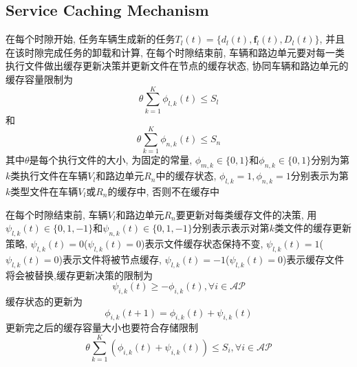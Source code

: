 \documentclass[lettersize,journal]{IEEEtran}
\begin{document}
{{\subsection{Service Caching Mechanism}
在每个时隙开始, 任务车辆生成新的任务$T_{l}(t)=\{d_{l}(t), \boldsymbol{f}_{l}(t),D_{l}(t)\}$, 并且在该时隙完成任务的卸载和计算, 在每个时隙结束前, 车辆和路边单元要对每一类执行文件做出缓存更新决策并更新文件在节点的缓存状态, 协同车辆和路边单元的缓存容量限制为
\begin{equation}
	\theta\sum^{K}_{k=1}{\phi_{l,k}(t)  } \le S_l
	\label{cache constraint vehicle}
\end{equation}
和
\begin{equation}
		\theta \sum^{K}_{k=1}{\phi_{n,k}(t) } \le S_n
		\label{cache constraint RSU}
\end{equation}
其中$ \theta $是每个执行文件的大小, 为固定的常量, $ \phi_{m,k}\in \{ 0,1 \} $和$ \phi_{n,k}\in \{ 0,1 \} $分别为第$ k $类执行文件在车辆$ V_l $和路边单元$ R_n $中的缓存状态, $ \phi_{l,k}=1,\phi_{n,k}=1  $分别表示为第$ k $类型文件在车辆$ V_l $或$ R_n $的缓存中, 否则不在缓存中 


在每个时隙结束前, 车辆$ V_l $和路边单元$ R_n $要更新对每类缓存文件的决策, 用$ \psi_{l,k}(t) \in \{ 0,1,-1 \} $和$ \psi_{n,k}(t) \in \{ 0,1,-1 \} $分别表示表示对第$ k $类文件的缓存更新策略, $ \psi_{l,k}(t)=0 $($ \psi_{l,k}(t)=0 $)表示文件缓存状态保持不变, $ \psi_{l,k}(t)=1 $($ \psi_{l,k}(t)=0 $)表示文件将被节点缓存, $ \psi_{l,k}(t)=-1 $($ \psi_{l,k}(t)=0 $)表示缓存文件将会被替换,缓存更新决策的限制为
\begin{equation}
	\psi_{i,k}(t) \geq - \phi_{i,k}(t), \forall i \in \mathcal{AP}
	\label{cache update constraint}
\end{equation}
缓存状态的更新为
\begin{equation}
	\phi_{i,k}(t+1) = \phi_{i,k}(t)+\psi_{i,k}(t)
	\label{cache update}
\end{equation}
更新完之后的缓存容量大小也要符合存储限制
\begin{equation}
		\theta\sum^{K}_{k=1}{ ( \phi_{i,k}(t)+\psi_{i,k}(t) ) } \le S_i, \forall i \in \mathcal{AP}
		\label{after cache update, constraint}
\end{equation}

}}
\end{document}

